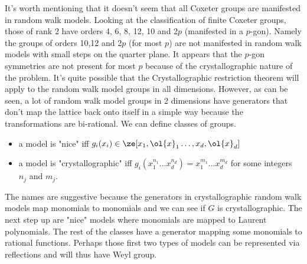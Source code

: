 It's worth mentioning that it doesn't seem that all Coxeter groups are manifested in random walk models. Looking at the classification of finite Coxeter groups, those of rank 2 have orders 4, 6, 8, 12, 10 and 2$p$ (manifested in a $p$-gon). Namely the groups of orders 10,12 and 2$p$ (for most $p$) are not manifested in random walk models with small steps on the quarter plane. It appears that the $p$-gon symmetries are not present for most $p$ because of the crystallographic nature of the problem. It's quite possible that the Crystallographic restriction theorem will apply to the random walk model groups in all dimensions. However, as can be seen, a lot of random walk model groups in 2 dimensions have generators that don't map the lattice back onto itself in a simple way because the transformations are bi-rational. We can define classes of groups.

\begin{itemize}
\item a model is "nice" iff $g_i(x_i) \in \ze[x_1,\ol{x}_1\ldots,x_d,\ol{x}_d]$
\item a model is "crystallographic" iff $g_i(x_1^{n_1}\ldots x_d^{n_d}) = x_1^{m_1}\ldots x_d^{m_d}$ for some integers $n_j$ and $m_j$.
\end{itemize}
The names are suggestive because the generators in crystallographic random walk models map monomials to monomials and we can see if $G$ is crystallographic. The next step up are "nice" models where monomials are mapped to Laurent polynomials. The rest of the classes have a generator mapping some monomials to rational functions. Perhaps those first two types of models can be represented via reflections and will thus have Weyl group.

\endinput
